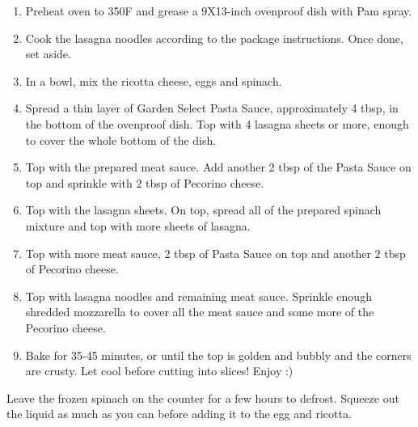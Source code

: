 \begin{enumerate}
    \item Preheat oven to 350\degree F and grease a 9X13-inch ovenproof dish with Pam spray.
    \item Cook the lasagna noodles according to the package instructions. Once done, set aside.
    \item In a bowl, mix the ricotta cheese, eggs and spinach.
    \item Spread a thin layer of Garden Select Pasta Sauce, approximately 4 tbsp, in the bottom of the ovenproof dish. Top with 4 lasagna sheets or more, enough to cover the whole bottom of the dish.
    \item Top with the prepared meat sauce. Add another 2 tbsp of the Pasta Sauce on top and sprinkle with 2 tbsp of Pecorino cheese.
    \item Top with the lasagna sheets. On top, spread all of the prepared spinach mixture and top with more sheets of lasagna.
    \item Top with more meat sauce, 2 tbsp of Pasta Sauce on top and another 2 tbsp of Pecorino cheese.
    \item Top with lasagna noodles and remaining meat sauce. Sprinkle enough shredded mozzarella to cover all the meat sauce and some more of the Pecorino cheese.
    \item Bake for 35-45 minutes, or until the top is golden and bubbly and the corners are crusty. Let cool before cutting into slices! Enjoy :)
\end{enumerate}

Leave the frozen spinach on the counter for a few hours to defrost. Squeeze out the liquid as much as you can before adding it to the egg and ricotta.

